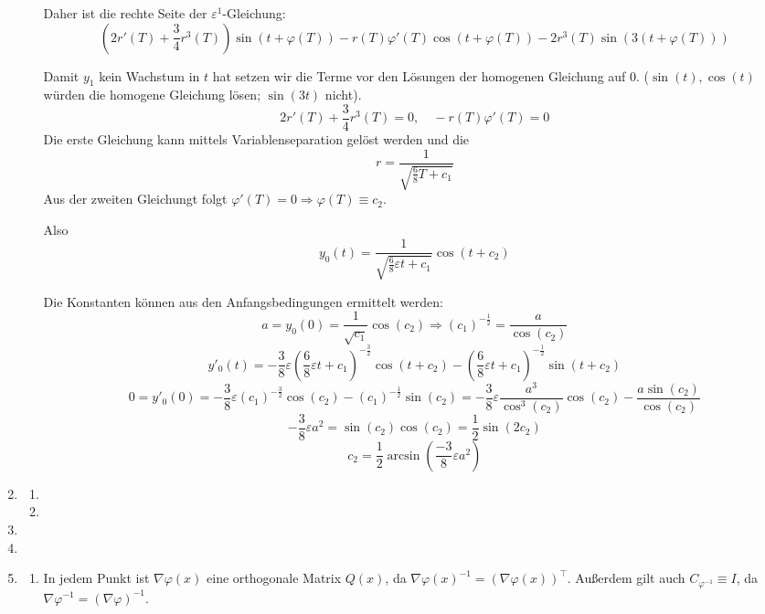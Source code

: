 \documentclass[a4paper,11pt]{scrartcl}
\newcommand*{\eps}{\varepsilon}
\begin{document}
\begin{enumerate}[label*=\textbf{9.\arabic*.}]
\begin{enumerate}
    Daher ist die rechte Seite der $\eps^1$-Gleichung:
    \[\left(2r'(T) + \frac{3}{4} r^3(T)\right) \sin(t + \varphi(T)) - r(T) \varphi'(T) \cos(t
     + \varphi(T)) - 2r^3(T) \sin(3(t + \varphi(T))) \]

   Damit $y_1$ kein Wachstum in $t$ hat setzen wir die Terme vor den Lösungen der
   homogenen Gleichung auf 0.
   ($\sin(t), \cos(t)$ würden die homogene Gleichung lösen; $\sin(3t)$ nicht).
   \[ 2r'(T) + \frac{3}{4}r^3(T) = 0, \quad -r(T)\varphi'(T) = 0\]
   Die erste Gleichung kann mittels Variablenseparation gelöst werden und die
   \[ r = \frac{1}{\sqrt{\frac{6}{8}T + c_1}}\]
   Aus der zweiten Gleichungt folgt $\varphi'(T) = 0 \Rightarrow \varphi(T) \equiv c_2$.

   Also
   \[y_0(t) = \frac{1}{\sqrt{\frac{6}{8}\eps t + c_1}} \cos(t + c_2)\]

   Die Konstanten können aus den Anfangsbedingungen ermittelt werden:
   \[a = y_0(0) = \frac{1}{\sqrt{c_1}} \cos(c_2) \Rightarrow
     (c_1)^{-\frac{1}{2}} = \frac{a}{\cos(c_2)}\]
   \[y'_0(t) = -\frac{3}{8}\eps \left(\frac{6}{8}\eps t +
       c_1\right)^{-\frac{3}{2}} \cos(t+c_2)- \left(\frac{6}{8}\eps t +
       c_1\right)^{-\frac{1}{2}} \sin(t + c_2)\]
   \[0 = y'_0(0) = -\frac{3}{8}\eps \left(c_1\right)^{-\frac{3}{2}} \cos(c_2)
     - \left(c_1\right)^{-\frac{1}{2}} \sin(c_2)
   = -\frac{3}{8} \eps \frac{a^3}{\cos^3(c_2)} \cos(c_2) - \frac{a\sin(c_2)}{\cos(c_2)}\]
 \[-\frac{3}{8} \eps a^2 = \sin(c_2)\cos(c_2) = \frac{1}{2}\sin(2c_2)\]
 \[c_2 = \frac{1}{2}\arcsin\left(\frac{-3}{8}\eps a^2\right)\]

\end{enumerate}


\item \begin{enumerate}
  \item
  \item
\end{enumerate}


\item


\item


\item \begin{enumerate}
  \item
    In jedem Punkt ist $\nabla \varphi(x)$ eine orthogonale Matrix $Q(x)$,
    da $\nabla\varphi(x)^{-1} = (\nabla \varphi(x))^\top$.
    Außerdem gilt auch $C_{\varphi^{-1}} \equiv I$, da $\nabla \varphi^{-1} =
    (\nabla \varphi)^{-1}$.


\end{enumerate}
\end{enumerate}
\end{document}
